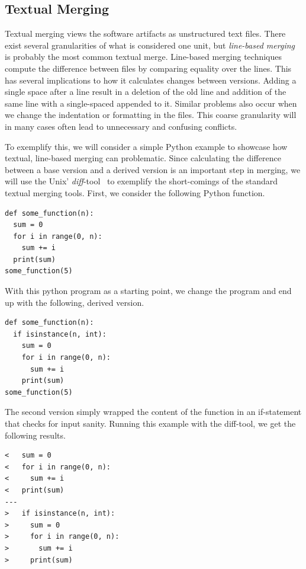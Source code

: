 \documentclass[a4paper,english]{ifimaster}
\begin{document}
\subsection{Textual Merging}%
\label{sub:textual_merging}

Textual merging views the software artifacts as unstructured text files. There exist several granularities of what is considered one unit, but \textit{line-based merging} is probably the most common textual merge. Line-based merging techniques compute the difference between files by comparing equality over the lines. This has several implications to how it calculates changes between versions. Adding a single space after a line result in a deletion of the old line and addition of the same line with a single-spaced appended to it. Similar problems also occur when we change the indentation or formatting in the files. This coarse granularity will in many cases often lead to unnecessary and confusing conflicts.

To exemplify this, we will consider a simple Python example to showcase how textual, line-based merging can problematic. Since calculating the difference between a base version and a derived version is an important step in merging, we will use the Unix' \textit{diff}-tool~\cite{cite:fast_algo_for_lcs} to exemplify the short-comings of the standard textual merging tools. First, we consider the following Python function.

\begin{verbatim}
def some_function(n):
  sum = 0
  for i in range(0, n):
    sum += i
  print(sum)
some_function(5)
\end{verbatim}

With this python program as a starting point, we change the program and end up with the following, derived version.

\begin{verbatim}
def some_function(n):
  if isinstance(n, int):
    sum = 0
    for i in range(0, n):
      sum += i
    print(sum)
some_function(5)
\end{verbatim}

The second version simply wrapped the content of the function in an if-statement that checks for input sanity. Running this example with the diff-tool, we get the following results.

\begin{verbatim}
<   sum = 0
<   for i in range(0, n):
<     sum += i
<   print(sum)
---
>   if isinstance(n, int):
>     sum = 0
>     for i in range(0, n):
>       sum += i
>     print(sum)
\end{verbatim}
\end{document}
